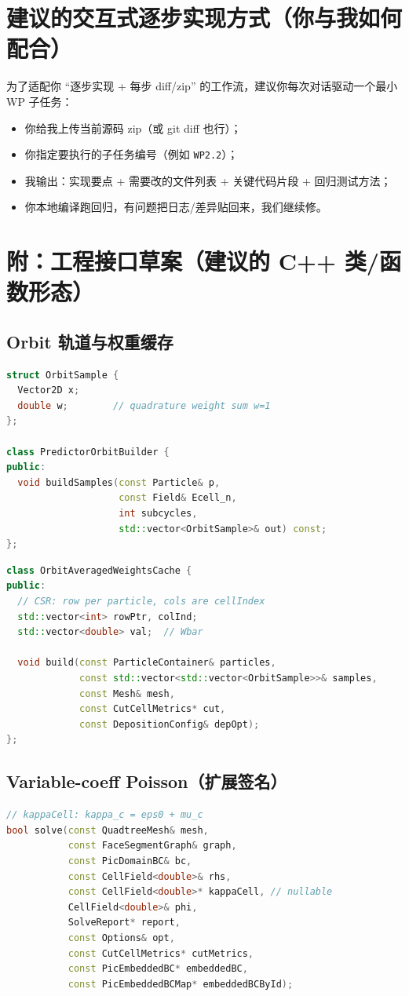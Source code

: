 \documentclass[UTF8,a4paper,12pt]{ctexart}
\newcommand{\code}[1]{\texttt{#1}}
\begin{document}
\section{建议的交互式逐步实现方式（你与我如何配合）}
为了适配你 ``逐步实现 + 每步 diff/zip'' 的工作流，建议你每次对话驱动一个最小 WP 子任务：
\begin{itemize}[leftmargin=2em]
  \item 你给我上传当前源码 zip（或 git diff 也行）；
  \item 你指定要执行的子任务编号（例如 \code{WP2.2}）；
  \item 我输出：实现要点 + 需要改的文件列表 + 关键代码片段 + 回归测试方法；
  \item 你本地编译跑回归，有问题把日志/差异贴回来，我们继续修。
\end{itemize}

\section{附：工程接口草案（建议的 C++ 类/函数形态）}

\subsection*{Orbit 轨道与权重缓存}
\begin{lstlisting}[language=C++,basicstyle=\ttfamily\small]
struct OrbitSample {
  Vector2D x;
  double w;        // quadrature weight sum w=1
};

class PredictorOrbitBuilder {
public:
  void buildSamples(const Particle& p,
                    const Field& Ecell_n,
                    int subcycles,
                    std::vector<OrbitSample>& out) const;
};
\end{lstlisting}

\begin{lstlisting}[language=C++,basicstyle=\ttfamily\small]
class OrbitAveragedWeightsCache {
public:
  // CSR: row per particle, cols are cellIndex
  std::vector<int> rowPtr, colInd;
  std::vector<double> val;  // Wbar

  void build(const ParticleContainer& particles,
             const std::vector<std::vector<OrbitSample>>& samples,
             const Mesh& mesh,
             const CutCellMetrics* cut,
             const DepositionConfig& depOpt);
};
\end{lstlisting}

\subsection*{Variable-coeff Poisson（扩展签名）}
\begin{lstlisting}[language=C++,basicstyle=\ttfamily\small]
// kappaCell: kappa_c = eps0 + mu_c
bool solve(const QuadtreeMesh& mesh,
           const FaceSegmentGraph& graph,
           const PicDomainBC& bc,
           const CellField<double>& rhs,
           const CellField<double>* kappaCell, // nullable
           CellField<double>& phi,
           SolveReport* report,
           const Options& opt,
           const CutCellMetrics* cutMetrics,
           const PicEmbeddedBC* embeddedBC,
           const PicEmbeddedBCMap* embeddedBCById);
\end{lstlisting}
\end{document}
